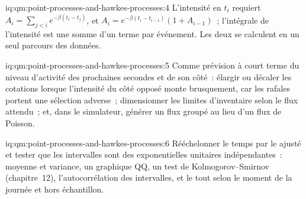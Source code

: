 \begin{solution}{iq:qm:point-processes-and-hawkes-processes:4}
L'intensité en $t_i$ requiert $A_i = \sum_{j<i}e^{-\beta(t_i - t_j)}$, et $A_i = e^{-\beta(t_i - t_{i-1})}(1 + A_{i-1})$~; l'intégrale
de l'intensité est une somme d'un terme par événement. Les deux se calculent en un seul parcours des données.
\end{solution}

\begin{solution}{iq:qm:point-processes-and-hawkes-processes:5}
Comme prévision à court terme du niveau d'activité des prochaines secondes et de son côté~: élargir ou décaler les cotations lorsque
l'intensité du côté opposé monte brusquement, car les rafales portent une sélection adverse~; dimensionner les limites d'inventaire selon le
flux attendu~; et, dans le simulateur, générer un flux groupé au lieu d'un flux de Poisson.
\end{solution}

\begin{solution}{iq:qm:point-processes-and-hawkes-processes:6}
Rééchelonner le temps par le  ajusté et tester que les intervalles sont des exponentielles unitaires indépendantes~: moyenne et
variance, un graphique QQ, un test de Kolmogorov--Smirnov (chapitre~12), l'autocorrélation des intervalles, et le tout selon le moment
de la journée et hors échantillon.
\end{solution}
